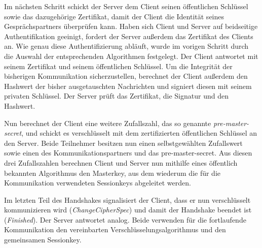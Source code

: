 Im nächsten Schritt schickt der Server dem Client seinen öffentlichen Schlüssel sowie das dazugehörige Zertifikat, damit der Client die Identität seines
Gesprächspartners überprüfen kann. Haben sich Client und Server auf beidseitige Authentifikation geeinigt, fordert der Server außerdem das Zertifikat des
Clients an.
Wie genau diese Authentifizierung abläuft, wurde im vorigen Schritt durch die Auswahl der entsprechenden Algorithmen festgelegt. Der Client antwortet mit
seinem Zertifikat und seinem öffentlichen Schlüssel. Um die Integrität der bisherigen Kommunikation sicherzustellen, berechnet der Client außerdem den Hashwert
der bisher ausgetauschten Nachrichten und signiert diesen mit seinem privaten Schlüssel. Der Server prüft das Zertifikat, die Signatur und den Hashwert.

Nun berechnet der Client eine weitere Zufallszahl, das so genannte \emph{pre-master-secret}, und schickt es verschlüsselt mit dem
zertifizierten öffentlichen Schlüssel an den Server. Beide Teilnehmer besitzen nun einen selbstgewählten Zufallswert sowie einen des
Kommunikationspartners und das pre-master-secret. Aus diesen drei Zufallszahlen berechnen Client und Server nun mithilfe eines öffentlich bekannten
Algorithmus den Masterkey, aus dem wiederum die für die Kommunikation verwendeten Sessionkeys abgeleitet werden.

Im letzten Teil des Handshakes signalisiert der Client, dass er nun verschlüsselt kommunizieren wird (\emph{ChangeCipherSpec}) und damit der
Handshake beendet ist (\emph{Finished}). Der Server antwortet analog. Beide verwenden für die fortlaufende Kommunikation den vereinbarten
Verschlüsselungsalgorithmus und den gemeinsamen Sessionkey.

